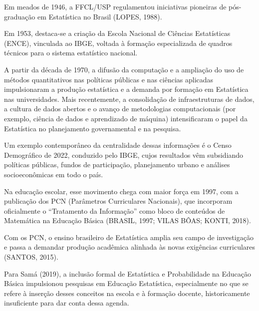 \vskip0.3cm

Em meados de 1946, a FFCL/USP regulamentou iniciativas pioneiras de pós-graduação em Estatística no Brasil (LOPES, 1988).\vskip0.3cm

Em 1953, destaca-se a criação da Escola Nacional de Ciências Estatísticas (ENCE), vinculada ao IBGE, voltada à formação especializada de quadros técnicos para o sistema estatístico nacional.


\vskip0.3cm

A partir da década de 1970, a difusão da computação e a ampliação do uso de métodos quantitativos nas políticas públicas e nas ciências aplicadas impulsionaram a produção estatística e a demanda por formação em Estatística nas universidades. Mais recentemente, a consolidação de infraestruturas de dados, a cultura de dados abertos e o avanço de metodologias computacionais (por exemplo, ciência de dados e aprendizado de máquina) intensificaram o papel da Estatística no planejamento governamental e na pesquisa.\vskip0.3cm

Um exemplo contemporâneo da centralidade dessas informações é o Censo Demográfico de 2022, conduzido pelo IBGE, cujos resultados vêm subsidiando políticas públicas, fundos de participação, planejamento urbano e análises socioeconômicas em todo o país.


\vskip0.3cm

Na educação escolar, esse movimento chega com maior força em 1997, com a publicação dos PCN (Parâmetros Curriculares Nacionais), que incorporam oficialmente o ``Tratamento da Informação'' como bloco de conteúdos de Matemática na Educação Básica (BRASIL, 1997; VILAS BÔAS; KONTI, 2018).\vskip0.3cm

Com os PCN, o ensino brasileiro de Estatística amplia seu campo de investigação e passa a demandar produção acadêmica alinhada às novas exigências curriculares (SANTOS, 2015). 

\newpage
Para Samá (2019), a inclusão formal de Estatística e Probabilidade na Educação Básica impulsionou pesquisas em Educação Estatística, especialmente no que se refere à inserção desses conceitos na escola e à formação docente, historicamente insuficiente para dar conta dessa agenda.\vskip0.3cm

